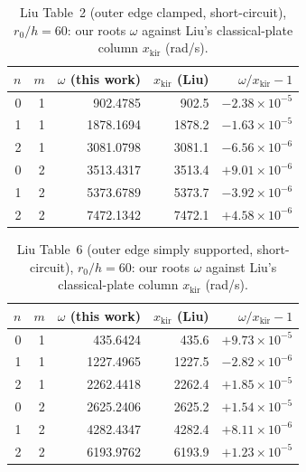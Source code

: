 \documentclass[11pt]{article}
\begin{document}
\begin{table}[ht]
\centering
\caption{Liu Table~2 (outer edge clamped, short-circuit), $r_0/h=60$: our roots $\omega$ against Liu's classical-plate column $x_{\mathrm{kir}}$ (rad/s).}
\label{tab:liu-t2}
\small
\begin{tabular}{@{}rrrrr@{}}
\toprule
$n$ & $m$ & $\omega$ (this work) & $x_{\mathrm{kir}}$ (Liu) & $\omega/x_{\mathrm{kir}}-1$ \\
\midrule
0 & 1 & 902.4785 & 902.5 & $-2.38\times10^{-5}$ \\
1 & 1 & 1878.1694 & 1878.2 & $-1.63\times10^{-5}$ \\
2 & 1 & 3081.0798 & 3081.1 & $-6.56\times10^{-6}$ \\
0 & 2 & 3513.4317 & 3513.4 & $+9.01\times10^{-6}$ \\
1 & 2 & 5373.6789 & 5373.7 & $-3.92\times10^{-6}$ \\
2 & 2 & 7472.1342 & 7472.1 & $+4.58\times10^{-6}$ \\
\bottomrule
\end{tabular}
\end{table}

\begin{table}[ht]
\centering
\caption{Liu Table~6 (outer edge simply supported, short-circuit), $r_0/h=60$: our roots $\omega$ against Liu's classical-plate column $x_{\mathrm{kir}}$ (rad/s).}
\label{tab:liu-t6}
\small
\begin{tabular}{@{}rrrrr@{}}
\toprule
$n$ & $m$ & $\omega$ (this work) & $x_{\mathrm{kir}}$ (Liu) & $\omega/x_{\mathrm{kir}}-1$ \\
\midrule
0 & 1 & 435.6424 & 435.6 & $+9.73\times10^{-5}$ \\
1 & 1 & 1227.4965 & 1227.5 & $-2.82\times10^{-6}$ \\
2 & 1 & 2262.4418 & 2262.4 & $+1.85\times10^{-5}$ \\
0 & 2 & 2625.2406 & 2625.2 & $+1.54\times10^{-5}$ \\
1 & 2 & 4282.4347 & 4282.4 & $+8.11\times10^{-6}$ \\
2 & 2 & 6193.9762 & 6193.9 & $+1.23\times10^{-5}$ \\
\bottomrule
\end{tabular}
\end{table}
\end{document}
